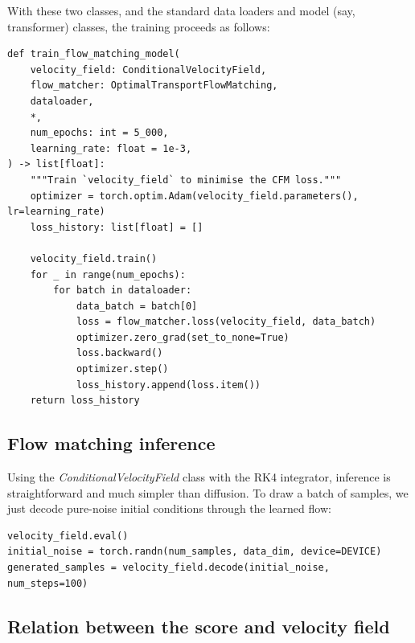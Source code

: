 \documentclass[usenames,dvipsnames]{article}
\begin{document}
With these two classes, and the standard data loaders and model (say, transformer) classes, the training proceeds as follows:


\begin{verbatim}
def train_flow_matching_model(
    velocity_field: ConditionalVelocityField,
    flow_matcher: OptimalTransportFlowMatching,
    dataloader,
    *,
    num_epochs: int = 5_000,
    learning_rate: float = 1e-3,
) -> list[float]:
    """Train `velocity_field` to minimise the CFM loss."""
    optimizer = torch.optim.Adam(velocity_field.parameters(), lr=learning_rate)
    loss_history: list[float] = []

    velocity_field.train()
    for _ in range(num_epochs):
        for batch in dataloader:
            data_batch = batch[0]
            loss = flow_matcher.loss(velocity_field, data_batch)
            optimizer.zero_grad(set_to_none=True)
            loss.backward()
            optimizer.step()
            loss_history.append(loss.item())
    return loss_history
\end{verbatim}


\subsection{Flow matching inference}

Using the \emph{ConditionalVelocityField} class with the RK4 integrator, inference is straightforward and much simpler than diffusion. To draw a batch of samples, we just decode pure-noise initial conditions through the learned flow:
\begin{verbatim}
velocity_field.eval()
initial_noise = torch.randn(num_samples, data_dim, device=DEVICE)
generated_samples = velocity_field.decode(initial_noise, num_steps=100)
\end{verbatim}








\subsection{Relation between the score and velocity field}
\end{document}
